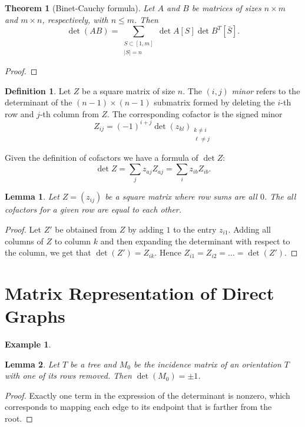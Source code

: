 \documentclass{report}
\newtheorem{theorem}{Theorem}[section]
\newtheorem{lemma}{Lemma}[section]
\theoremstyle{definition}
\newtheorem{definition}{Definition}[section]
\newtheorem{example}{Example}[section]
\theoremstyle{remark}
\numberwithin{equation}{section}
\begin{document}
\begin{theorem}[Binet-Cauchy formula]
    Let $A$ and $B$ be matrices of sizes $n \times m$ and $m \times n$, respectively, with $n \leq m$. Then \[
        \det (AB) = \sum_{\substack{S \subset [1, m] \\ |S| = n}} \det A[S] \det B^T[\bar{S}].    
    \]
\end{theorem}
\begin{proof}
    
\end{proof}

\begin{definition}
    Let $Z$ be a square matrix of size $n$. The $(i,j)$ \emph{minor} refers to the determinant of the $(n-1) \times (n-1)$ submatrix formed by deleting the $i$-th row and $j$-th column from $Z$. The corresponding cofactor is the signed minor
    \[Z_{ij} = (-1)^{i + j}\det(z_{kl})_{\substack{k \neq i \\ \ell \neq j}}\]
\end{definition}
Given the definition of cofactors we have a formula of $\det Z$:
\[
    \det Z = \sum_j z_{aj}Z_{aj} = \sum_{i}z_{ib}Z_{ib}.    
\]

\begin{lemma}
    Let $Z = (z_{ij})$ be a square matrix where row sums are all $0$. The all cofactors for a given row are equal to each other.
\end{lemma}
\begin{proof}
    Let $Z'$ be obtained from $Z$ by adding $1$ to the entry $z_{i1}$. Adding all columns of $Z$ to column $k$ and then expanding the determinant with respect to the column, we get that $\det(Z') = Z_{ik}$. Hence $Z_{i1} = Z_{i2} = \ldots = \det(Z')$.
\end{proof}

\section{Matrix Representation of Direct Graphs}
\begin{example}
    
\end{example}
\begin{lemma}
    Let $T$ be a tree and $M_0$ be the incidence matrix of an orientation $T$ with one of its rows removed. Then $\det(M_0) = \pm 1$.
\end{lemma}
\begin{proof}
    Exactly one term in the expression of the determinant is nonzero, which corresponds to mapping each edge to its endpoint that is farther from the root.
\end{proof}
\end{document}

